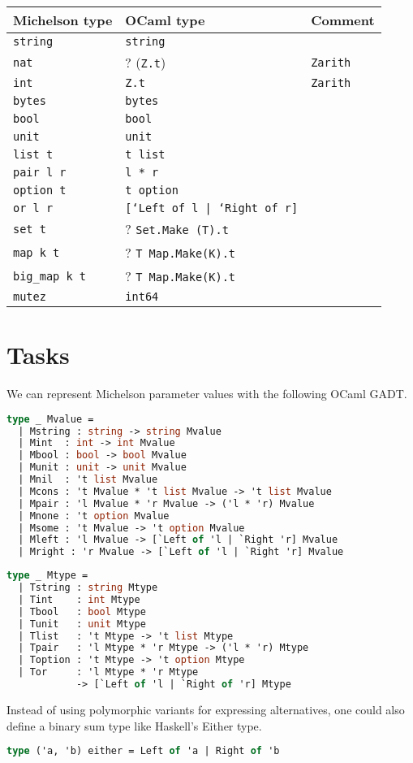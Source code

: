 \documentclass{article}
\begin{document}
\begin{center}
  \begin{tabular}{|l|l|l}
    Michelson type & OCaml type & Comment \\\hline
    \texttt{string}& \texttt{string}  \\
    \texttt{nat} & ? (\texttt{Z.t}) & \texttt{Zarith} \\
    \texttt{int} & \texttt{Z.t} & \texttt{Zarith}\\ 
    \texttt{bytes}& \texttt{bytes} \\
    \texttt{bool}&\texttt{bool} \\
    \texttt{unit}&\texttt{unit} \\
    \texttt{list t}&\texttt{t list} \\
    \texttt{pair l r}&\texttt{l * r} \\
    \texttt{option t}     &\texttt{t option} \\
    \texttt{or l r}&\texttt{[`Left of l | `Right of r]} \\
    \texttt{set t}&? \texttt{Set.Make (T).t} \\
    \texttt{map k t}&? \texttt{T Map.Make(K).t} \\
    \texttt{big\_map k t}&? \texttt{T Map.Make(K).t} \\
    \texttt{mutez} & \texttt{int64} \\
    \hline
  \end{tabular}
\end{center}

\section{Tasks}
\label{sec:tasks}

We can represent Michelson parameter values with the following OCaml GADT.
\begin{lstlisting}[language=Caml]
type _ Mvalue =
  | Mstring : string -> string Mvalue
  | Mint  : int -> int Mvalue
  | Mbool : bool -> bool Mvalue
  | Munit : unit -> unit Mvalue
  | Mnil  : 't list Mvalue
  | Mcons : 't Mvalue * 't list Mvalue -> 't list Mvalue
  | Mpair : 'l Mvalue * 'r Mvalue -> ('l * 'r) Mvalue
  | Mnone : 't option Mvalue
  | Msome : 't Mvalue -> 't option Mvalue
  | Mleft : 'l Mvalue -> [`Left of 'l | `Right 'r] Mvalue
  | Mright : 'r Mvalue -> [`Left of 'l | `Right 'r] Mvalue
\end{lstlisting}

\begin{lstlisting}[language=Caml]
type _ Mtype = 
  | Tstring : string Mtype
  | Tint    : int Mtype
  | Tbool   : bool Mtype
  | Tunit   : unit Mtype
  | Tlist   : 't Mtype -> 't list Mtype
  | Tpair   : 'l Mtype * 'r Mtype -> ('l * 'r) Mtype
  | Toption : 't Mtype -> 't option Mtype
  | Tor     : 'l Mtype * 'r Mtype 
            -> [`Left of 'l | `Right of 'r] Mtype
\end{lstlisting}
Instead of using polymorphic variants for expressing alternatives, one could also define a binary
sum type like Haskell's Either type.
\begin{lstlisting}[language=Caml]
type ('a, 'b) either = Left of 'a | Right of 'b
\end{lstlisting}
\end{document}
